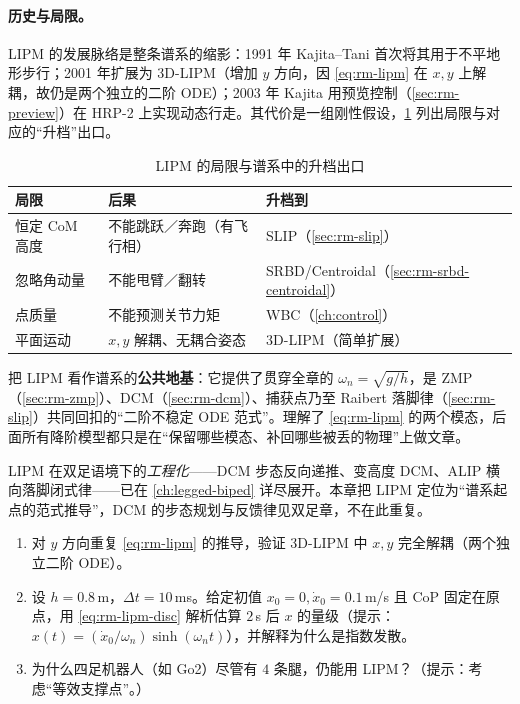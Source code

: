 \paragraph{历史与局限。}
LIPM 的发展脉络是整条谱系的缩影：1991 年 Kajita–Tani 首次将其用于不平地形步行\cite{kajita1991study}；2001 年扩展为 3D-LIPM（增加 $y$ 方向，因 \cref{eq:rm-lipm} 在 $x,y$ 上解耦，故仍是两个独立的二阶 ODE）\cite{kajita2001lipm}；2003 年 Kajita 用预览控制（\cref{sec:rm-preview}）在 HRP-2 上实现动态行走。其代价是一组刚性假设，\cref{tab:rm-lipm-limit} 列出局限与对应的“升档”出口。

\begin{table}[H]\centering\small
\caption{LIPM 的局限与谱系中的升档出口}
\label{tab:rm-lipm-limit}
\begin{tabular}{lll}
\toprule
局限 & 后果 & 升档到 \\
\midrule
恒定 CoM 高度 & 不能跳跃／奔跑（有飞行相） & SLIP（\cref{sec:rm-slip}） \\
忽略角动量 & 不能甩臂／翻转 & SRBD/Centroidal（\cref{sec:rm-srbd-centroidal}） \\
点质量 & 不能预测关节力矩 & WBC（\cref{ch:control}） \\
平面运动 & $x,y$ 解耦、无耦合姿态 & 3D-LIPM（简单扩展） \\
\bottomrule
\end{tabular}
\end{table}

\begin{insight}
把 LIPM 看作谱系的\textbf{公共地基}：它提供了贯穿全章的 $\omega_n=\sqrt{g/h}$，是 ZMP（\cref{sec:rm-zmp}）、DCM（\cref{sec:rm-dcm}）、捕获点乃至 Raibert 落脚律（\cref{sec:rm-slip}）共同回扣的“二阶不稳定 ODE 范式”。理解了 \cref{eq:rm-lipm} 的两个模态，后面所有降阶模型都只是在“保留哪些模态、补回哪些被丢的物理”上做文章。
\end{insight}

\begin{note}
LIPM 在双足语境下的\emph{工程化}——DCM 步态反向递推、变高度 DCM、ALIP 横向落脚闭式律——已在 \cref{ch:legged-biped} 详尽展开。本章把 LIPM 定位为“谱系起点的范式推导”，DCM 的步态规划与反馈律见双足章，不在此重复。
\end{note}

\begin{exercise}
\begin{enumerate}
  \item 对 $y$ 方向重复 \cref{eq:rm-lipm} 的推导，验证 3D-LIPM 中 $x,y$ 完全解耦（两个独立二阶 ODE）。
  \item 设 $h=0.8$\,m，$\Delta t=10$\,ms。给定初值 $x_0=0,\dot{x}_0=0.1$\,m/s 且 CoP 固定在原点，用 \cref{eq:rm-lipm-disc} 解析估算 $2$\,s 后 $x$ 的量级（提示：$x(t)=(\dot{x}_0/\omega_n)\sinh(\omega_n t)$），并解释为什么是指数发散。
  \item 为什么四足机器人（如 Go2）尽管有 $4$ 条腿，仍能用 LIPM？（提示：考虑“等效支撑点”。）
\end{enumerate}
\end{exercise}

